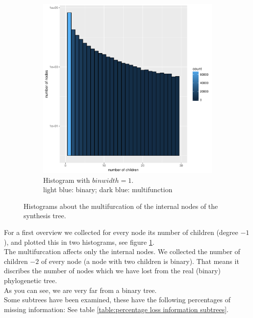 \begin{figure}[h]
\begin{subfigure}[b]{0.42\textwidth}
          \includegraphics[trim = 0mm 0mm 30mm 0mm, clip, width=\textwidth]{Figures/multifurc_small.pdf}
          \caption{Histogram with $binwidth = 1$. \\ light blue: binary; dark blue: multifunction}
        \end{subfigure}
        \caption{Histograms about the multifurcation of the internal nodes of the synthesis tree.}
        \label{fig:childrenOfNodes}
      \end{figure}

      For a first overview we collected for every node its number of children (degree $-1$), and plotted
        this in two histograms, see figure \ref{fig:childrenOfNodes}. \\
      The multifurcation affects only the internal nodes. We collected the number of children $-2$ of 
        every node (a node with two children is binary). That means it discribes the number of nodes which we have lost from the real (binary) 
      phylogenetic tree. \\
      As you can see, we are very far from a binary tree. \\

      Some subtrees have been examined, these have the following percentages of missing information: See 
        table \ref{table:percentage loss information subtrees}.


